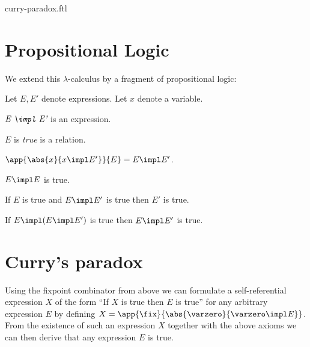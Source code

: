 \documentclass{article}
\begin{document}
\begin{smodule}{curry-paradox.ftl}
\section*{Propositional Logic}

\noindent We extend this $\lambda$-calculus by a fragment of propositional
logic:

\begin{forthel}  
  Let $E, E'$ denote expressions.
  Let $x$ denote a variable.

  \begin{signature*}[title=Implication,id=implication,for=impl]
    $\emph{E \impl E'}$ is an expression.
  \end{signature*}

  \begin{signature*}[title=Truth,id=truth]
    $E$ is \emph{true} is a relation.
  \end{signature*}

  \begin{axiom*}[title=$\beta$-reduction,id=beta_reduction]
    $\app{\abs{x}{x \impl E'}}{E} = E \impl E'$.
  \end{axiom*}

  \begin{axiom*}[title=Reflexivity,id=reflexivity]
    $E \impl E$ is true.
  \end{axiom*}

  \begin{axiom*}[title=Modus Ponens,id=modus_ponens]
    If $E$ is true and $E \impl E'$ is true then $E'$ is true.
  \end{axiom*}

  \begin{axiom*}[title=Strengthening,id=strengthening]
    If $E \impl (E \impl E')$ is true then $E \impl E'$ is true.
  \end{axiom*}
\end{forthel}


\section*{Curry's paradox}

\noindent Using the fixpoint combinator from above we can formulate a 
self-referential expression $X$ of the form ``If $X$ is true then $E$ is
true'' for any arbitrary expression $E$ by defining
$X = \app{\fix}{\abs{\varzero}{\varzero \impl E}}$.
From the existence of such an expression $X$ together with the above axioms 
we can then derive that any expression $E$ is true.


\end{smodule}
\end{document}
